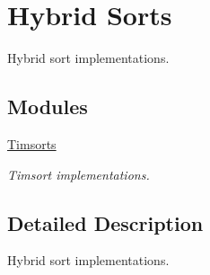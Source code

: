 \hypertarget{group__HybridSort}{}\section{Hybrid Sorts}
\label{group__HybridSort}


Hybrid sort implementations.  


\subsection*{Modules}
\begin{DoxyCompactItemize}
\item 
\hyperlink{group__Timsort}{Timsorts}
\begin{DoxyCompactList}\small\item\em Timsort implementations. \end{DoxyCompactList}\end{DoxyCompactItemize}


\subsection{Detailed Description}
Hybrid sort implementations. 

